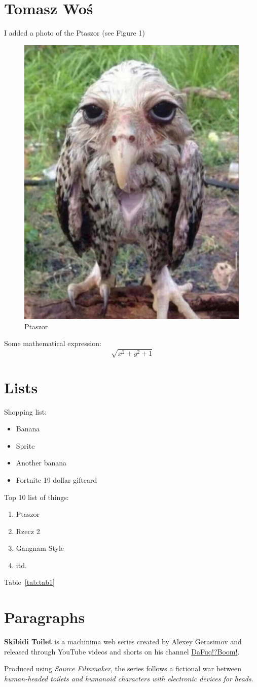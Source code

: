 
\section{Tomasz Woś}
\label{sec:twos}

I added a photo of the Ptaszor (see Figure 1)
\begin{figure}[htbp]
    \centering
    \includegraphics[width=0.5\linewidth]{pictures/ptaszor.png}
    \caption{Ptaszor}
    \label{fig:e-label}
\end{figure}



Some mathematical expression:
\[\sqrt{x^2+y^2+1}\]
\newpage
\section*{Lists}
Shopping list:
\begin{itemize}
 \item Banana
 \item Sprite
 \item Another banana
 \item Fortnite 19 dollar giftcard
\end{itemize}

Top 10 list of things:
\begin{enumerate}
 \item Ptaszor
 \item Rzecz 2
 \item Gangnam Style
 \item itd.
 \label{tab:topten}
\end{enumerate}

\par Table~\ref{tab:tab1} 

\section*{Paragraphs}
\par \textbf{Skibidi Toilet} is a machinima web series created by Alexey Gerasimov and released through YouTube videos and shorts on his channel \underline{DaFuq!?Boom!}. 
\par Produced using \emph{Source Filmmaker}, the series follows a fictional war between \textit{human-headed toilets and humanoid characters with electronic devices for heads}. 